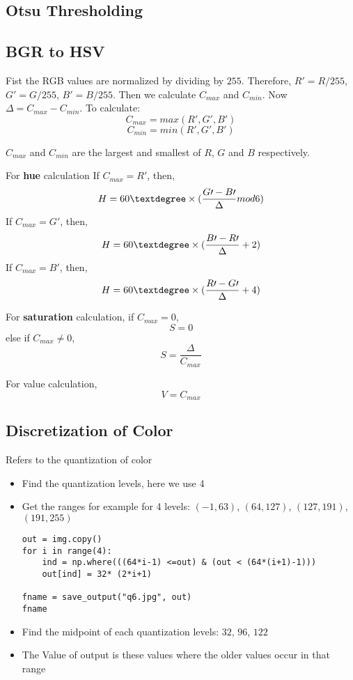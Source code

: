 \documentclass[letterpaper, 11pt]{article}
\begin{document}
\subsection{Otsu Thresholding}
\label{sec:org09de26b}
\subsection{BGR to HSV}
\label{sec:org6b41493}
Fist the RGB values are normalized by dividing by \(255\). Therefore, \(R\prime = R/255\), \(G\prime = G/255\), \(B\prime = B/255\).
Then we calculate \(C_{max}\) and \(C_{min}\). Now \(\Delta = C_{max} - C_{min}\).
To calculate:
\[C_{max} = max(R\prime, G\prime, B\prime)\]
\[C_{min} = min(R\prime, G\prime, B\prime)\]

\(C_{max}\) and \(C_{min}\) are the largest and smallest of \(R\), \(G\) and \(B\) respectively.

For \textbf{hue} calculation
If \(C_{max} = R\prime\), then,
\[H = 60\textdegree \times (\frac{G\prime - B\prime}{\Delta} mod 6)\]
If \(C_{max} = G\prime\), then,
\[H = 60\textdegree \times (\frac{B\prime - R\prime}{\Delta} + 2)\]
If \(C_{max} = B\prime\), then,
\[H = 60\textdegree \times (\frac{R\prime - G\prime}{\Delta} + 4)\]

For \textbf{saturation} calculation,
if \(C_{max} = 0\),
\[S = 0\]
else if \(C_{max} \ne 0\),
\[S = \frac{\Delta}{C_{max}}\]

For value calculation,
\[V = C_{max}\]
\subsection{Discretization of Color}
\label{sec:orgd3d798b}
Refers to the quantization of color
\begin{itemize}
\item Find the quantization levels, here we use 4
\item Get the ranges for example for 4 levels: \((-1, 63)\), \((64, 127)\), \((127, 191)\), \((191, 255)\)
\begin{verbatim}
out = img.copy()
for i in range(4):
    ind = np.where(((64*i-1) <=out) & (out < (64*(i+1)-1)))
    out[ind] = 32* (2*i+1)

fname = save_output("q6.jpg", out)
fname
\end{verbatim}

\item Find the midpoint of each quantization levels: \(32\), \(96\), \(122\)
\item The Value of output is these values where the older values occur in that range
\end{itemize}
\end{document}
